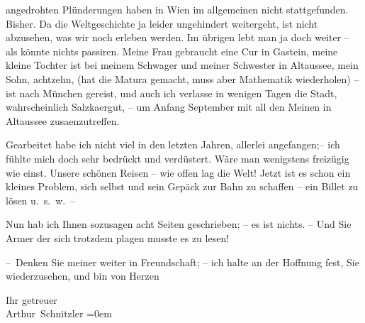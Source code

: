                angedrohten Plünderungen haben in Wien im
               allgemeinen nicht stattgefunden. Bisher. Da die Weltgeschichte ja leider ungehindert
               weitergeht, ist nicht abzusehen, was wir noch erleben werden. Im übrigen lebt man ja
               doch weiter – als könnte nichts passiren. Meine Frau gebraucht eine Cur in Gastein, meine kleine Tochter ist bei meinem Schwager und meiner Schwester in Altaussee, mein Sohn, achtzehn, (hat die
               Matura gemacht, muss aber Mathematik wiederholen) – ist nach München gereist, und auch ich verlasse in wenigen Tagen die
               Stadt, wahrschein{\pb}lich Salzka{\geminationm}ergut, – um Anfang September
               mit all den Meinen in Altaussee zusa{\geminationm}enzutreffen.\pend
           
\pstart
           Gearbeitet habe ich nicht viel in den letzten Jahren, allerlei angefangen;– ich
               fühlte mich doch sehr bedrückt und verdüstert. Wäre man wenigstens freizügig wie
               einst. Unsere schönen Reisen – wie offen lag die Welt! Jetzt ist es schon ein kleines
               Problem, sich selbst und sein Gepäck zur Bahn zu schaffen – ein Billet zu lösen
               u. s. w. –\pend
           
\pstart
           Nun hab ich Ihnen sozusagen acht Seiten geschrieben; – es ist nichts. – Und Sie Armer
               der sich trotzdem plagen musste es zu lesen!\pend
           
\pstart
           – Denken Sie meiner weiter in Freundschaft; – ich halte an der Hoffnung fest, Sie
               wiederzusehen, und bin von Herzen\pend
           
\pstart
           Ihr getreuer{\\[\baselineskip]}\spacefill\mbox{Arthur Schnitzler}\pend
           \leftskip=0em{}\endnumbering{}  
      
